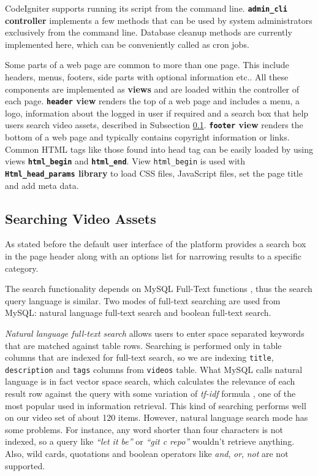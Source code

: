 CodeIgniter supports running its script from the command line. \textbf{\texttt{admin_cli} controller} implements a few methods that can be used by system administrators exclusively from the command line. Database cleanup methods are currently implemented here, which can be conveniently called as cron jobs.

Some parts of a web page are common to more than one page. This include headers, menus, footers, side parts with optional information etc.. All these components are implemented as \textbf{views} and are loaded within the controller of each page. \textbf{\texttt{header} view} renders the top of a web page and includes a menu, a logo, information about the logged in user if required and a search box that help users search video assets, described in Subsection \ref{subsec:searching}. \textbf{\texttt{footer} view} renders the bottom of a web page and typically contains copyright information or links. Common HTML tags like those found into head tag can be easily loaded by using views \textbf{\texttt{html_begin}} and \textbf{\texttt{html_end}}. View \texttt{html_begin} is used with \textbf{\texttt{Html_head_params} library} to load CSS files, JavaScript files, set the page title and add meta data.

\subsection{Searching Video Assets}
\label{subsec:searching}

As stated before the default user interface of the platform provides a search box in the page header along with an options list for narrowing results to a specific category.

The search functionality depends on MySQL Full-Text functions \cite{mysql-fulltext}, thus the search query language is similar. Two modes of full-text searching are used from MySQL: natural language full-text search and boolean full-text search. 

\textit{Natural language full-text search} allows users to enter space separated keywords that are matched against table rows. Searching is performed only in table columns that are indexed for full-text search, so we are indexing \texttt{title}, \texttt{description} and \texttt{tags} columns from \texttt{videos} table. What MySQL calls natural language is in fact vector space search, which calculates the relevance of each result row against the query with some variation of \textit{tf-idf} formula \cite{tf-idf}, one of the most popular used in information retrieval. This kind of searching performs well on our video set of about 120 items. However, natural language search mode has some problems. For instance, any word shorter than four characters is not indexed, so a query like \textit{``let it be''} or \textit{``git c repo''} wouldn't retrieve anything. Also, wild cards, quotations and boolean operators like \textit{and}, \textit{or}, \textit{not} are not supported.

